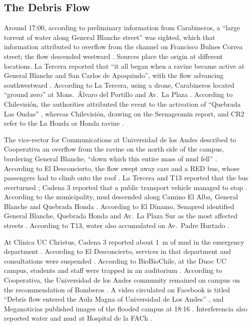 \subsection*{The Debris Flow}
Around 17:00, according to preliminary information from Carabineros, a ``large torrent of water along General Blanche street'' was sighted, which that information attributed to overflow from the channel on Francisco Bulnes Correa street; the flow descended westward \citep{theclinic2026frontal,eldesconcierto2026}. Sources place the origin at different locations. La Tercera reported that ``it all began when a ravine became active at General Blanche and San Carlos de Apoquindo'', with the flow advancing southwestward \citep{latercera2026}. According to La Tercera, using a drone, Carabineros located ``ground zero'' at Mons.\ Álvaro del Portillo and Av.\ La Plaza \citep{latercera2026zonacero}. According to Chilevisión, the authorities attributed the event to the activation of ``Quebrada Las Ondas'' \citep{chilevision2026mapa}, whereas Chilevisión, drawing on the Sernageomin report, and CR2 refer to the La Honda or Honda ravine \citep{chilevision2026,cr2_2026}.

The vice-rector for Communications at Universidad de los Andes described to Cooperativa an overflow from the ravine on the north side of the campus, bordering General Blanche, ``down which this entire mass of mud fell'' \citep{cooperativa2026}. According to El Desconcierto, the flow swept away cars and a RED bus, whose passengers had to climb onto the roof \citep{eldesconcierto2026}. La Tercera and T13 reported that the bus overturned \citep{latercera2026,t13_2026vehiculos}; Cadena 3 reported that a public transport vehicle managed to stop \citep{cadena3_2026}. According to the municipality, mud descended along Camino El Alba, General Blanche and Quebrada Honda \citep{latercera2026,chilevision2026mapa}. According to El Dínamo, Senapred identified General Blanche, Quebrada Honda and Av.\ La Plaza Sur as the most affected streets \citep{eldinamo2026}. According to T13, water also accumulated on Av.\ Padre Hurtado \citep{t13_2026vehiculos}.

At Clínica UC Christus, Cadena 3 reported about \SI{1}{m} of mud in the emergency department \citep{cadena3_2026}. According to El Desconcierto, services in that department and consultations were suspended \citep{eldesconcierto2026}. According to BioBioChile, at the Duoc UC campus, students and staff were trapped in an auditorium \citep{biobio2026duoc}. According to Cooperativa, the Universidad de los Andes community remained on campus on the recommendation of Bomberos \citep{cooperativa2026}. A video circulated on Facebook is titled ``Debris flow entered the Aula Magna of Universidad de Los Andes'' \citep{quintaconectado2026}, and Meganoticias published images of the flooded campus at 18:16 \citep{meganoticias2026uandes}. Interferencia also reported water and mud at Hospital de la FACh \citep{interferencia2026}.

